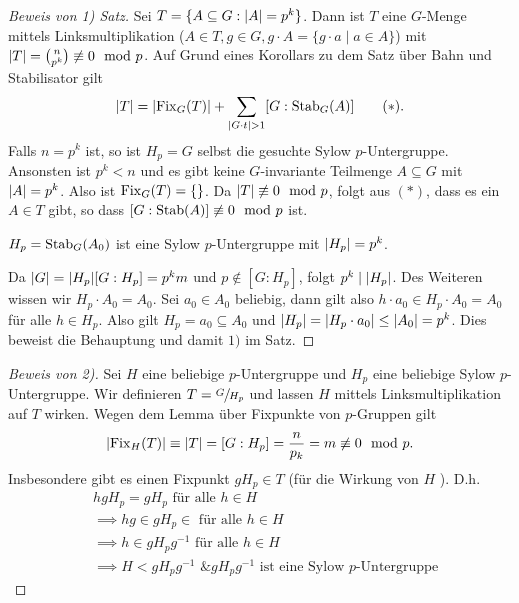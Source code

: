 \begin{proof}[Beweis von 1) Satz]
	Sei $T = \{ A \subseteq G: \abs{A} = p^{k}\} $. Dann ist $T$ eine $G$-Menge mittels Linksmultiplikation ($A \in T, g \in G, g \cdot A = \{g \cdot a \mid a \in A\}$)
	mit $\abs{T} = \binom{n}{p^{k}} \not\equiv 0 \mod p$.
	Auf Grund eines Korollars zu dem Satz über Bahn und Stabilisator gilt
	\[
		\abs{T} = \abs{\operatorname{Fix}_{G}(T)} + \sum_{\abs{G \cdot t} > 1} [G: \operatorname{Stab}_{G}(A)] \tag{$*$}
	.\] 
	Falls $n = p^{k}$ ist, so ist $H_{p} = G$ selbst die gesuchte Sylow $p$-Untergruppe.
	Ansonsten ist $p^{k} < n$ und es gibt keine $G$-invariante Teilmenge $A \subseteq G$ mit $\abs{A} = p^{k}$.
	Also ist $\operatorname{Fix}_{G}(T) = \{\} $. Da $\abs{T} \not\equiv 0 \mod p$, folgt aus $(*)$, dass es ein $A \in T$ gibt, so dass $[G: \operatorname{Stab}(A)] \not\equiv 0 \mod p$ ist.

	\begin{remark}
		$H_{p} = \operatorname{Stab}_{G}(A_0)$ ist eine Sylow $p$-Untergruppe mit $\abs{H_{p}} = p^{k}$.
	\end{remark}
		Da $\abs{G} = \abs{H_{p}} [G: H_{p}] = p^{k} m $ und $p \not\in [G: H_{p}]$, folgt $p^{k} \mid \abs{H_{p}}$.
		Des Weiteren wissen wir $H_{p} \cdot A_0 = A_0$. Sei $a_0 \in A_0$ beliebig, dann gilt also
		$h \cdot a_0 \in H_{p} \cdot A_0 = A_0$ für alle $h \in H_{p}$.
		Also gilt $H_{p} = a_0 \subseteq A_0$ und $\abs{H_{p}} = \abs{H_{p} \cdot a_0} \leq \abs{A_0} = p^{k}$.
		Dies beweist die Behauptung und damit $1)$ im Satz.
\end{proof}

\begin{proof}[Beweis von 2)]
	Sei $H$ eine beliebige $p$-Untergruppe und $H_{p}$ eine beliebige Sylow $p$-Untergruppe.
	Wir definieren $T = \sfrac{G}{H_{p}}$ und lassen $H$ mittels Linksmultiplikation auf $T$ wirken.
	Wegen dem Lemma über Fixpunkte von $p$-Gruppen gilt
	\[
		\abs{\operatorname{Fix}_{H}(T)} \equiv \abs{T} = [G: H_{p}] = \frac{n}{p_{k}} = m \not\equiv 0 \mod p
	.\] 
	Insbesondere gibt es einen Fixpunkt $g H_{p} \in T$ (für die Wirkung von $H$ ).
	D.h. 
	\begin{align*}
		&hg H_{p} = g H_{p} \text{ für alle } h \in H\\
		&\implies hg \in g H_{p} \in \text{ für alle } h \in H\\
		&\implies h \in g H_{p} g^{-1} \text{ für alle } h \in H\\
		&\implies H < g H_{p} g^{-1} \text{ \& } g H_{p} g^{-1} \text{ ist eine Sylow $p$-Untergruppe}
	\end{align*}
\end{proof}


